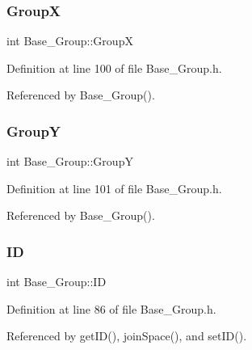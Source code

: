 \subsubsection{\texorpdfstring{GroupX}{GroupX}}
{\footnotesize\ttfamily int Base\+\_\+\+Group\+::\+GroupX\hspace{0.3cm}{\ttfamily [private]}}



Definition at line 100 of file Base\+\_\+\+Group.\+h.



Referenced by Base\+\_\+\+Group().

\mbox{\label{class_base___group_adf6cb605c43eaa82f21150e84c629e17}} 
\subsubsection{\texorpdfstring{GroupY}{GroupY}}
{\footnotesize\ttfamily int Base\+\_\+\+Group\+::\+GroupY\hspace{0.3cm}{\ttfamily [private]}}



Definition at line 101 of file Base\+\_\+\+Group.\+h.



Referenced by Base\+\_\+\+Group().

\mbox{\label{class_base___group_ae6ea7525642b45edafb56589d9945f90}} 
\subsubsection{\texorpdfstring{ID}{ID}}
{\footnotesize\ttfamily int Base\+\_\+\+Group\+::\+ID\hspace{0.3cm}{\ttfamily [private]}}



Definition at line 86 of file Base\+\_\+\+Group.\+h.



Referenced by get\+I\+D(), join\+Space(), and set\+I\+D().

\mbox{\label{class_base___group_ad9dc72068ed8309820873de4084aa602}} 

